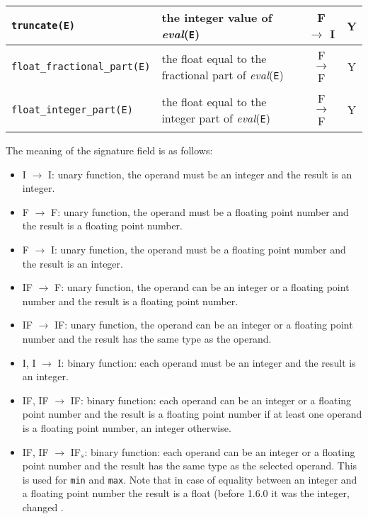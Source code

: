 \begin{supertabular}{|l|L{7.5cm}|c|c|}
\texttt{truncate(E)} & the integer value of \textit{eval}(\texttt{E}) & F
$\rightarrow$ I & Y \\

\hline

\texttt{float\_fractional\_part(E)} & the float equal to the fractional part
of \textit{eval}(\texttt{E}) & F $\rightarrow$ F & Y \\

\hline

\texttt{float\_integer\_part(E)} & the float equal to the integer part of
\textit{eval}(\texttt{E}) & F $\rightarrow$ F & Y \\

\hline
\end{supertabular}

The meaning of the signature field is as follows:

\begin{itemize}

\item I $\rightarrow$ I: unary function, the operand must be an integer and
  the result is an integer.

\item F $\rightarrow$ F: unary function, the operand must be a floating point
  number and the result is a floating point number.

\item F $\rightarrow$ I: unary function, the operand must be a floating point
  number and the result is an integer.

\item IF $\rightarrow$ F: unary function, the operand can be an integer or a
  floating point number and the result is a floating point number.

\item IF $\rightarrow$ IF: unary function, the operand can be an integer or a
  floating point number and the result has the same type as the operand.

\item I, I $\rightarrow$ I: binary function: each operand must be an integer
  and the result is an integer.

\item IF, IF $\rightarrow$ IF: binary function: each operand can be an
  integer or a floating point number and the result is a floating point
  number if at least one operand is a floating point number, an integer
  otherwise.

\item IF, IF $\rightarrow$ IF$_s$: binary function: each operand can be an
  integer or a floating point number and the result has the same type as the
  selected operand. This is used for \texttt{min} and \texttt{max}. Note that
  in case of equality between an integer and a floating point number the
  result is a float (before 1.6.0 it was the integer, changed .

\end{itemize}

